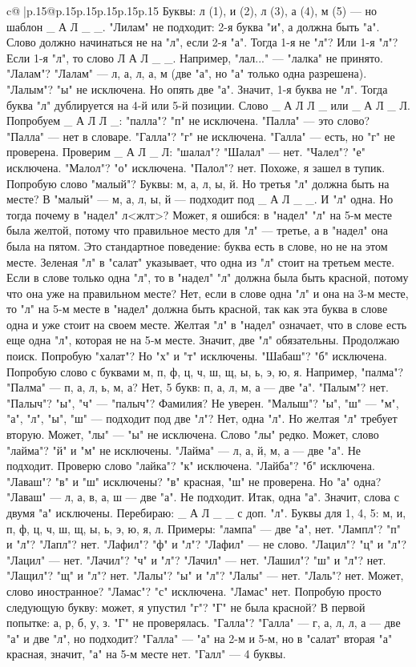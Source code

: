 \documentclass{article}
\begin{document}
{\begin{supertabular}{c@{$\;$}|p{.15\linewidth}@{}p{.15\linewidth}p{.15\linewidth}p{.15\linewidth}p{.15\linewidth}p{.15\linewidth}}
{{{Буквы: л (1), и (2), л (3), а (4), м (5) — но шаблон \_ А Л \_ \_. "Лилам" не подходит: 2{-}я буква "и", а должна быть "а". Слово должно начинаться не на "л", если 2{-}я "а". Тогда 1{-}я не "л"? Или 1{-}я "л"? Если 1{-}я "л", то слово Л А Л \_ \_. Например, "лал..." — "лалка" не принято. "Лалам"? "Лалам" — л, а, л, а, м (две "а", но "а" только одна разрешена). "Лалым"? "ы" не исключена. Но опять две "а". Значит, 1{-}я буква не "л". Тогда буква "л" дублируется на 4{-}й или 5{-}й позиции. Слово \_ А Л Л \_ или \_ А Л \_ Л. Попробуем \_ А Л Л \_: "палла"? "п" не исключена. "Палла" — это слово? "Палла" — нет в словаре. "Галла"? "г" не исключена. "Галла" — есть, но "г" не проверена. Проверим \_ А Л \_ Л: "шалал"? "Шалал" — нет. "Чалел"? "е" исключена. "Малол"? "о" исключена. "Палол"? нет. Похоже, я зашел в тупик. Попробую слово "малый"? Буквы: м, а, л, ы, й. Но третья "л" должна быть на месте? В "малый" — м, а, л, ы, й — подходит под \_ А Л \_ \_. И "л" одна. Но тогда почему в "надел" л<жлт>? Может, я ошибся: в "надел" "л" на 5{-}м месте была желтой, потому что правильное место для "л" — третье, а в "надел" она была на пятом. Это стандартное поведение: буква есть в слове, но не на этом месте. Зеленая "л" в "салат" указывает, что одна из "л" стоит на третьем месте. Если в слове только одна "л", то в "надел" "л" должна была быть красной, потому что она уже на правильном месте? Нет, если в слове одна "л" и она на 3{-}м месте, то "л" на 5{-}м месте в "надел" должна быть красной, так как эта буква в слове одна и уже стоит на своем месте. Желтая "л" в "надел" означает, что в слове есть еще одна "л", которая не на 5{-}м месте. Значит, две "л" обязательны. Продолжаю поиск. Попробую "халат"? Но "х" и "т" исключены. "Шабаш"? "б" исключена. Попробую слово с буквами м, п, ф, ц, ч, ш, щ, ы, ь, э, ю, я. Например, "палма"? "Палма" — п, а, л, ь, м, а? Нет, 5 букв: п, а, л, м, а — две "а". "Палым"? нет. "Палыч"? "ы", "ч" — "палыч"? Фамилия? Не уверен. "Малыш"? "ы", "ш" — "м", "а", "л", "ы", "ш" — подходит под две "л"? Нет, одна "л". Но желтая "л" требует вторую. Может, "лы" — "ы" не исключена. Слово "лы" редко. Может, слово "лайма"? "й" и "м" не исключены. "Лайма" — л, а, й, м, а — две "а". Не подходит. Проверю слово "лайка"? "к" исключена. "Лайба"? "б" исключена. "Лаваш"? "в" и "ш" исключены? "в" красная, "ш" не проверена. Но "а" одна? "Лаваш" — л, а, в, а, ш — две "а". Не подходит. Итак, одна "а". Значит, слова с двумя "а" исключены. Перебираю: \_ А Л \_ \_ с доп. "л". Буквы для 1, 4, 5: м, и, п, ф, ц, ч, ш, щ, ы, ь, э, ю, я, л. Примеры: "лампа" — две "а", нет. "Лампл"? "п" и "л"? "Лапл"? нет. "Лафил"? "ф" и "л"? "Лафил" — не слово. "Лацил"? "ц" и "л"? "Лацил" — нет. "Лачил"? "ч" и "л"? "Лачил" — нет. "Лашил"? "ш" и "л"? нет. "Лащил"? "щ" и "л"? нет. "Лалы"? "ы" и "л"? "Лалы" — нет. "Лаль"? нет. Может, слово иностранное? "Ламас"? "с" исключена. "Ламас" нет. Попробую просто следующую букву: может, я упустил "г"? "Г" не была красной? В первой попытке: а, р, б, у, з. "Г" не проверялась. "Галла"? "Галла" — г, а, л, л, а — две "а" и две "л", но подходит? "Галла" — "а" на 2{-}м и 5{-}м, но в "салат" вторая "а" красная, значит, "а" на 5{-}м месте нет. "Галл" — 4 буквы. }}}
\end{supertabular}}
\end{document}
